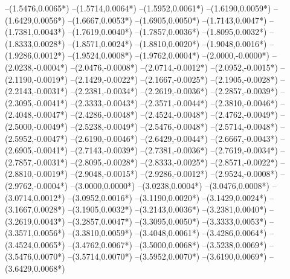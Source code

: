 {	--(1.5476,{0.0065*\yskala})
	--(1.5714,{0.0064*\yskala})
	--(1.5952,{0.0061*\yskala})
	--(1.6190,{0.0059*\yskala})
	--(1.6429,{0.0056*\yskala})
	--(1.6667,{0.0053*\yskala})
	--(1.6905,{0.0050*\yskala})
	--(1.7143,{0.0047*\yskala})
	--(1.7381,{0.0043*\yskala})
	--(1.7619,{0.0040*\yskala})
	--(1.7857,{0.0036*\yskala})
	--(1.8095,{0.0032*\yskala})
	--(1.8333,{0.0028*\yskala})
	--(1.8571,{0.0024*\yskala})
	--(1.8810,{0.0020*\yskala})
	--(1.9048,{0.0016*\yskala})
	--(1.9286,{0.0012*\yskala})
	--(1.9524,{0.0008*\yskala})
	--(1.9762,{0.0004*\yskala})
	--(2.0000,{-0.0000*\yskala})
	--(2.0238,{-0.0004*\yskala})
	--(2.0476,{-0.0008*\yskala})
	--(2.0714,{-0.0012*\yskala})
	--(2.0952,{-0.0015*\yskala})
	--(2.1190,{-0.0019*\yskala})
	--(2.1429,{-0.0022*\yskala})
	--(2.1667,{-0.0025*\yskala})
	--(2.1905,{-0.0028*\yskala})
	--(2.2143,{-0.0031*\yskala})
	--(2.2381,{-0.0034*\yskala})
	--(2.2619,{-0.0036*\yskala})
	--(2.2857,{-0.0039*\yskala})
	--(2.3095,{-0.0041*\yskala})
	--(2.3333,{-0.0043*\yskala})
	--(2.3571,{-0.0044*\yskala})
	--(2.3810,{-0.0046*\yskala})
	--(2.4048,{-0.0047*\yskala})
	--(2.4286,{-0.0048*\yskala})
	--(2.4524,{-0.0048*\yskala})
	--(2.4762,{-0.0049*\yskala})
	--(2.5000,{-0.0049*\yskala})
	--(2.5238,{-0.0049*\yskala})
	--(2.5476,{-0.0048*\yskala})
	--(2.5714,{-0.0048*\yskala})
	--(2.5952,{-0.0047*\yskala})
	--(2.6190,{-0.0046*\yskala})
	--(2.6429,{-0.0044*\yskala})
	--(2.6667,{-0.0043*\yskala})
	--(2.6905,{-0.0041*\yskala})
	--(2.7143,{-0.0039*\yskala})
	--(2.7381,{-0.0036*\yskala})
	--(2.7619,{-0.0034*\yskala})
	--(2.7857,{-0.0031*\yskala})
	--(2.8095,{-0.0028*\yskala})
	--(2.8333,{-0.0025*\yskala})
	--(2.8571,{-0.0022*\yskala})
	--(2.8810,{-0.0019*\yskala})
	--(2.9048,{-0.0015*\yskala})
	--(2.9286,{-0.0012*\yskala})
	--(2.9524,{-0.0008*\yskala})
	--(2.9762,{-0.0004*\yskala})
	--(3.0000,{0.0000*\yskala})
	--(3.0238,{0.0004*\yskala})
	--(3.0476,{0.0008*\yskala})
	--(3.0714,{0.0012*\yskala})
	--(3.0952,{0.0016*\yskala})
	--(3.1190,{0.0020*\yskala})
	--(3.1429,{0.0024*\yskala})
	--(3.1667,{0.0028*\yskala})
	--(3.1905,{0.0032*\yskala})
	--(3.2143,{0.0036*\yskala})
	--(3.2381,{0.0040*\yskala})
	--(3.2619,{0.0043*\yskala})
	--(3.2857,{0.0047*\yskala})
	--(3.3095,{0.0050*\yskala})
	--(3.3333,{0.0053*\yskala})
	--(3.3571,{0.0056*\yskala})
	--(3.3810,{0.0059*\yskala})
	--(3.4048,{0.0061*\yskala})
	--(3.4286,{0.0064*\yskala})
	--(3.4524,{0.0065*\yskala})
	--(3.4762,{0.0067*\yskala})
	--(3.5000,{0.0068*\yskala})
	--(3.5238,{0.0069*\yskala})
	--(3.5476,{0.0070*\yskala})
	--(3.5714,{0.0070*\yskala})
	--(3.5952,{0.0070*\yskala})
	--(3.6190,{0.0069*\yskala})
	--(3.6429,{0.0068*\yskala})
}

